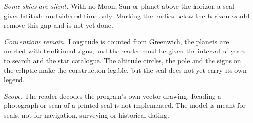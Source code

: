 \documentclass[10pt,twocolumn,a4paper]{article}
\begin{document}
\emph{Some skies are silent.} With no Moon, Sun or planet above the horizon
a seal gives latitude and sidereal time only. Marking the bodies below the
horizon would remove this gap and is not yet done.

\emph{Conventions remain.} Longitude is counted from Greenwich, the planets
are marked with traditional signs, and the reader must be given the interval
of years to search and the star catalogue. The altitude circles, the pole
and the signs on the ecliptic make the construction legible, but the seal
does not yet carry its own legend.

\emph{Scope.} The reader decodes the program's own vector drawing. Reading a
photograph or scan of a printed seal is not implemented. The model is meant
for seals, not for navigation, surveying or historical dating.



\end{document}
